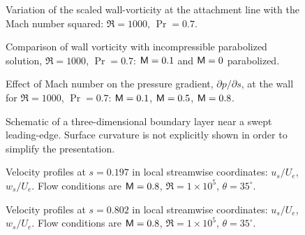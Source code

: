 %
\begin{figure}[p]
\centering
{}
\epsfxsize=5.4in 
\caption [Variation of the scaled wall-vorticity at the attachment line with
the Mach number squared]{Variation of the scaled wall-vorticity at the
attachment line with the Mach number squared: $\Re=1000$,
$\Pr=0.7$. \label{f:attach} }
\end{figure}
%
\begin{figure}[p]
\centering
{}
\epsfxsize=5.4in 
\caption [Comparison of wall vorticity with an incompressible parabolized
solution] {Comparison of wall vorticity with incompressible parabolized
solution, $\Re=1000$, $\Pr=0.7$: \solid ${\sf M}=0.1$ and \dashed ${\sf M}=0$
parabolized. \label{f:parabolic} }
\end{figure}
%
\begin{figure}[p]
\centering
{}
\epsfxsize=5.4in 
\caption [Effect of Mach number on the pressure gradient at the wall.] {Effect
of Mach number on the pressure gradient, $\partial p/\partial s$, at the wall
for $\Re=1000$, $\Pr=0.7$: \solid ${\sf M}=0.1$, \dashed ${\sf M}=0.5$, \dotted
${\sf M}=0.8$. \label{f:pg_mach} }
\end{figure}
%
%
%
\begin{figure}[p]
\centering
\epsfxsize=5in 
\caption [Schematic of a three-dimensional boundary layer]{Schematic of a
three-dimensional boundary layer near a swept leading-edge. Surface curvature
is not explicitly shown in order to simplify the presentation. \label{f:3dbl}
}
\end{figure}
%
\begin{figure}[p]
\centering
{}
\epsfxsize=5.4in 
\caption [Velocity profiles at $s=0.197$] {Velocity profiles at $s=0.197$ in
local streamwise coordinates: \solid $u_s/U_e$, \dashed $w_s/U_e$.  Flow
conditions are ${\sf M}=0.8$, $\Re=1\times 10^5$, $\theta=35^\circ$.
\label{f:pro1} }
\end{figure}
%
\begin{figure}[p]
\centering
{}
\epsfxsize=5.4in 
\caption [Velocity profiles at $s=0.802$] {Velocity profiles at $s=0.802$ in
local streamwise coordinates: \solid $u_s/U_e$, \dashed $w_s/U_e$.  Flow
conditions are ${\sf M}=0.8$, $\Re=1\times 10^5$, $\theta=35^\circ$. \label{f:pro2}
}
\end{figure}
